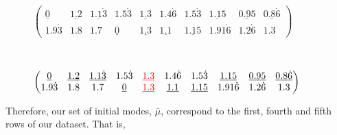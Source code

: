 \begin{example}
\begin{figure}[H]
        \vspace{1cm}

        \begin{minipage}{\textwidth}
            \centering
            \(
            \begin{pmatrix}
                \underline{0} & \underline{1.2} &
                \underline{1.1\dot{3}} & 1.5\dot{3} & \underline{1.3}
                & 1.4\dot{6} & 1.5\dot{3} & \underline{1.15} &
                \underline{0.95} & \underline{0.8\dot{6}}
                \\
                1.9\dot{3} & 1.8 & 1.7 & \underline{0} &
                \underline{1.3} & \underline{1.1} &
                \underline{1.15} & 1.91\dot{6} & 1.2\dot{6} & 1.3
            \end{pmatrix}
            \)
            \label{%
            fig:cao-matrix-2}
        \end{minipage}\\

        \vspace{1cm}

        \begin{minipage}{\textwidth}
            \centering
            \(
            \begin{pmatrix}
                \underline{0} & \underline{1.2} & \underline{1.1\dot{3}} &
                1.5\dot{3} & \textcolor{red}{\underline{1.3}} & 1.4\dot{6} &
                1.5\dot{3} & \underline{1.15} & \underline{0.95} &
                \underline{0.8\dot{6}}
                \\
                1.9\dot{3} & 1.8 & 1.7 & \underline{0} &
                \textcolor{red}{\underline{1.3}} & \underline{1.1} &
                \underline{1.15} & 1.91\dot{6} & 1.2\dot{6} & 1.3
            \end{pmatrix}
            \)
            \label{%
            fig:cao-matrix-3}
        \end{minipage}
    \end{figure}

    Therefore, our set of initial modes, \(\bar{\mu}\), correspond to the first,
    fourth and fifth rows of our dataset. That is,
    
    
\end{example}

